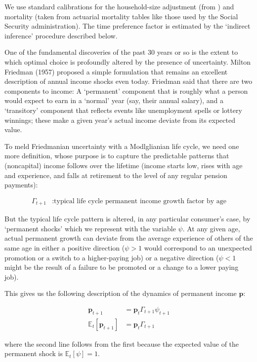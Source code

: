 \documentclass{article}
\newcommand{\pLvl}{\mathbf{p}}
\newcommand{\Ex}{\mathbb{E}}
\newcommand{\permGroFac}{\Gamma}
\newcommand{\permShk}{\psi}
\begin{document}
We use standard calibrations for the household-size adjustment (from \cite{Cagetti_2003}) and mortality (taken from actuarial mortality tables like those used by the Social Security administration). The time preference factor is estimated by the `indirect inference' procedure described below.

One of the fundamental discoveries of the past 30 years or so is the extent to which optimal choice is profoundly altered by the presence of uncertainty. Milton Friedman (1957) proposed a simple formulation that remains an excellent description of annual income shocks even today. Friedman said that there are two components to income: A `permanent' component that is roughly what a person would expect to earn in a `normal' year (say, their annual salary), and a `transitory' component that reflects events like unemployment spells or lottery winnings; these make a given year's actual income deviate from its expected value.

To meld Friedmanian uncertainty with a Modlglianian life cycle, we need one more definition, whose purpose is to capture the predictable patterns that (noncapital) income follows over the lifetime (income starts low, rises with age and experience, and falls at retirement to the level of any regular pension payments):

\begin{align}
    \permGroFac_{t+1} & : \text{typical life cycle permanent income growth factor by age}
\end{align}

But the typical life cycle pattern is altered, in any particular consumer's case, by `permanent shocks' which we represent with the variable $\permShk$. At any given age, actual permanent growth can deviate from the average experience of others of the same age in either a positive direction ($\psi>1$ would correspond to an unexpected promotion or a switch to a higher-paying job) or a negative direction ($\psi < 1$ might be the result of a failure to be promoted or a change to a lower paying job).

This gives us the following description of the dynamics of permanent income $\pLvl$:

\begin{align}
    \pLvl_{t+1} & = \pLvl_{t} \permGroFac_{t+1} \permShk_{t+1}
    \\ \Ex_{t}[\pLvl_{t+1}] & = \pLvl_{t} \permGroFac_{t+1}
\end{align}

where the second line follows from the first because the expected value of the permanent shock is $\Ex_{t}[\permShk]=1$.
\end{document}
